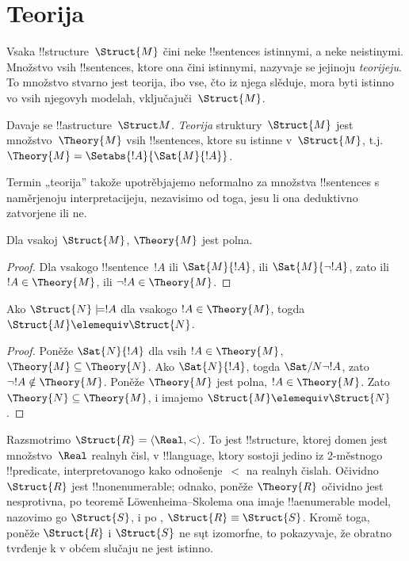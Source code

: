 \documentclass[../../../include/open-logic-section]{subfiles}
\begin{document}

\section{Teorija }

Vsaka !!{structure}~$\Struct{M}$ čini neke !!{sentence}s istinnymi, a
neke neistinymi. Množstvo vsih !!{sentence}s, ktore ona čini istinnymi,
nazyvaje se jejinoju \emph{teorijeju}. To množstvo stvarno jest
teorija, ibo vse, čto iz njega slěduje, mora byti istinno vo vsih
njegovyh modelah, vključajuči~$\Struct{M}$.

\begin{defn}
  Davaje se !!a{structure}~$\Struct M$. \emph{Teorija}
  struktury~$\Struct{M}$ jest množstvo~$\Theory{M}$ vsih
  !!{sentence}s, ktore su istinne v~$\Struct{M}$, t.j. $\Theory{M} =
  \Setabs{!A}{\Sat{M}{!A}}$.
\end{defn}

Termin „teorija” takože upotrěbjajemo neformalno za množstva
!!{sentence}s s naměrjenoju interpretacijeju, nezavisimo od toga, jesu
li ona deduktivno zatvorjene ili ne.

\begin{prop}
Dla vsakoj $\Struct{M}$, $\Theory{M}$ jest polna.
\end{prop}

\begin{proof}
Dla vsakogo !!{sentence}~$!A$ ili $\Sat{M}{!A}$, ili
$\Sat{M}{\lnot !A}$, zato ili $!A \in \Theory{M}$, ili
$\lnot !A \in \Theory{M}$.
\end{proof}

\begin{prop}
  Ako $\Struct{N} \models !A$ dla vsakogo $!A \in \Theory{M}$, togda
  $\Struct{M} \elemequiv \Struct{N}$.
\end{prop}

\begin{proof}
Poněže $\Sat{N}{!A}$ dla vsih $!A \in \Theory{M}$, $\Theory{M}
\subseteq \Theory{N}$. Ako $\Sat{N}{!A}$, togda
$\Sat/{N}{\lnot !A}$, zato $\lnot !A \notin \Theory{M}$. Poněže
$\Theory{M}$ jest polna, $!A \in \Theory{M}$. Zato $\Theory{N}
\subseteq \Theory{M}$, i imajemo $\Struct{M} \elemequiv \Struct{N}$.
\end{proof}

\begin{rem}
  Razsmotrimo $\Struct{R} = \langle\Real, <\rangle$. To jest
  !!{structure}, ktorej domen jest množstvo~$\Real$ realnyh čisl, v !!{language},
  ktory sostoji jedino iz 2-městnogo !!{predicate}, interpretovanogo
  kako odnošenje~$<$ na realnyh čislah. Očividno $\Struct{R}$ jest
  !!{nonenumerable}; odnako, poněže $\Theory{R}$ očividno jest
  nesprotivna, po teoremě L\"owenheima--Skolema ona imaje
  !!a{enumerable} model, nazovimo go $\Struct{S}$, i po
  , $\Struct{R} \equiv \Struct{S}$. Kromě toga,
  poněže $\Struct{R}$ i $\Struct{S}$ ne sųt izomorfne, to pokazyvaje,
  že obratno tvrđenje k  v obćem slučaju ne
  jest istinno.
\end{rem}
\end{document}
